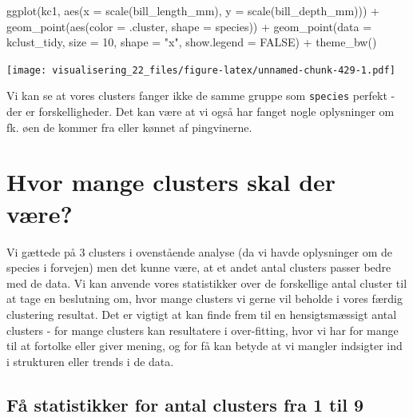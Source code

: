 \documentclass[
]{book}
\newenvironment{Shaded}{\begin{snugshade}}{\end{snugshade}}
\newcommand{\AttributeTok}[1]{\textcolor[rgb]{0.77,0.63,0.00}{#1}}
\newcommand{\ConstantTok}[1]{\textcolor[rgb]{0.00,0.00,0.00}{#1}}
\newcommand{\DecValTok}[1]{\textcolor[rgb]{0.00,0.00,0.81}{#1}}
\newcommand{\FunctionTok}[1]{\textcolor[rgb]{0.00,0.00,0.00}{#1}}
\newcommand{\NormalTok}[1]{#1}
\newcommand{\SpecialCharTok}[1]{\textcolor[rgb]{0.00,0.00,0.00}{#1}}
\newcommand{\StringTok}[1]{\textcolor[rgb]{0.31,0.60,0.02}{#1}}
\begin{document}
\begin{Shaded}
\begin{Highlighting}[]
\FunctionTok{ggplot}\NormalTok{(kc1, }\FunctionTok{aes}\NormalTok{(}\AttributeTok{x =} \FunctionTok{scale}\NormalTok{(bill\_length\_mm), }
                \AttributeTok{y =} \FunctionTok{scale}\NormalTok{(bill\_depth\_mm))) }\SpecialCharTok{+} 
  \FunctionTok{geom\_point}\NormalTok{(}\FunctionTok{aes}\NormalTok{(}\AttributeTok{color =}\NormalTok{ .cluster, }\AttributeTok{shape =}\NormalTok{ species)) }\SpecialCharTok{+}
  \FunctionTok{geom\_point}\NormalTok{(}\AttributeTok{data =}\NormalTok{ kclust\_tidy, }
             \AttributeTok{size =} \DecValTok{10}\NormalTok{, }\AttributeTok{shape =} \StringTok{"x"}\NormalTok{, }\AttributeTok{show.legend =} \ConstantTok{FALSE}\NormalTok{) }\SpecialCharTok{+} 
  \FunctionTok{theme\_bw}\NormalTok{()}
\end{Highlighting}
\end{Shaded}

\texttt{[image: visualisering\_22\_files/figure-latex/unnamed-chunk-429-1.pdf]}

Vi kan se at vores clusters fanger ikke de samme gruppe som \texttt{species} perfekt - der er forskelligheder. Det kan være at vi også har fanget nogle oplysninger om fk. øen de kommer fra eller kønnet af pingvinerne.

\hypertarget{hvor-mange-clusters-skal-der-vuxe6re}{%
\section{Hvor mange clusters skal der være?}\label{hvor-mange-clusters-skal-der-vuxe6re}}

Vi gættede på 3 clusters i ovenstående analyse (da vi havde oplysninger om de species i forvejen) men det kunne være, at et andet antal clusters passer bedre med de data. Vi kan anvende vores statistikker over de forskellige antal cluster til at tage en beslutning om, hvor mange clusters vi gerne vil beholde i vores færdig clustering resultat. Det er vigtigt at kan finde frem til en hensigtsmæssigt antal clusters - for mange clusters kan resultatere i over-fitting, hvor vi har for mange til at fortolke eller giver mening, og for få kan betyde at vi mangler indsigter ind i strukturen eller trends i de data.

\hypertarget{fuxe5-statistikker-for-antal-clusters-fra-1-til-9}{%
\subsection{Få statistikker for antal clusters fra 1 til 9}\label{fuxe5-statistikker-for-antal-clusters-fra-1-til-9}}
\end{document}
